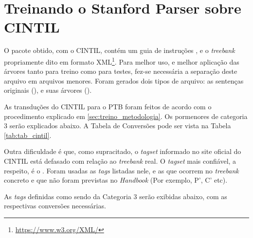 \section{Treinando o Stanford Parser sobre CINTIL}
\label{sec:treinando_sp_cintil}

O pacote obtido, com o CINTIL, contém um guia de instruções \cite{narrativeDescriptionCintil}, e o \textit{treebank} propriamente dito em formato XML\footnote{\url{https://www.w3.org/XML/}}. Para melhor uso, e melhor aplicação das árvores tanto para treino como para testes, fez-se necessária a separação deste arquivo em arquivos menores. Foram gerados dois tipos de arquivo: as sentenças originais (), e suas árvores ().

As transduções do CINTIL para o PTB foram feitos de acordo com o procedimento explicado em \ref{sec:treino_metodologia}. Os pormenores de categoria 3 serão explicados abaixo. A Tabela de Conversões pode ser vista na Tabela \ref{tab:tab_cintil}.

Outra dificuldade é que, como supracitado, o \textit{tagset} informado no site oficial do CINTIL está defasado com relação ao \textit{treebank} real. O \textit{tagset} mais confiável, a respeito, é o  \cite{cintil_handbook}. Foram usadas as \textit{tags} listadas nele, e as que ocorrem no \textit{treebank} concreto e que não foram previstas no \textit{Handbook} (Por exemplo, P’, C’ etc).

\begin{center}

\end{center}

As \textit{tags} definidas como sendo da Categoria 3 serão exibidas abaixo, com as respectivas conversões necessárias.
